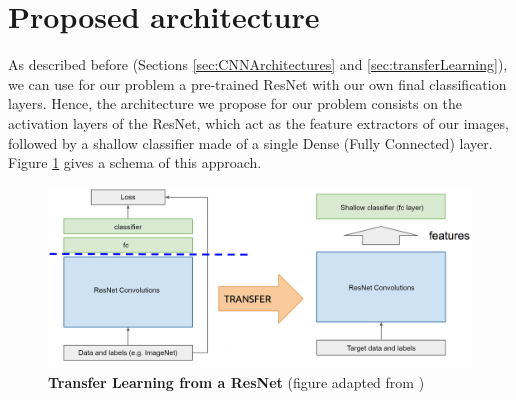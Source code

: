 


\section{Proposed architecture}\label{sec:dl_architecture}

As described before (Sections \ref{sec:CNNArchitectures} and \ref{sec:transferLearning}), we can use for our problem a pre-trained ResNet with our own final classification layers. Hence, the architecture we propose for our problem consists on the activation layers of the ResNet, which act as the feature extractors of our images, followed by a shallow classifier made of a single Dense (Fully Connected) layer. Figure \ref{fig:transfer_learning} gives a schema of this approach.

\begin{figure}[h!]
	\centering
	\captionsetup{width=1\linewidth}
	\includegraphics[width=1\textwidth]{Figures/transfer_learning.png}
	\caption{\textbf{Transfer Learning from a ResNet} (figure adapted from \parencite{McGuinness2017})}
	\label{fig:transfer_learning}
\end{figure}


